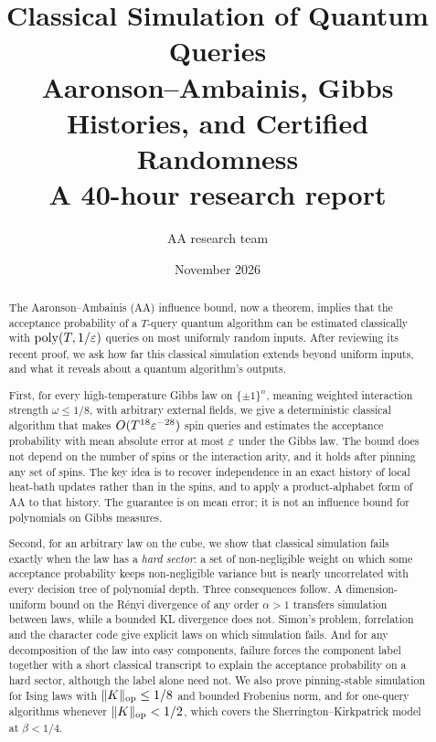\documentclass[11pt]{article}
\title{\textbf{Classical Simulation of Quantum Queries}\\[5pt]
{\Large Aaronson--Ambainis, Gibbs Histories, and Certified Randomness}\\[5pt]
{\large A 40-hour research report}}
\author{AA research team}
\date{November 2026}
\theoremstyle{definition}\newtheorem{definition}[theorem]{Definition}
\theoremstyle{remark}\newtheorem{remark}[theorem]{Remark}
\DeclareMathOperator{\poly}{poly}\DeclareMathOperator{\CAdv}{CAdv}
\begin{document}
\maketitle
\thispagestyle{fancy}
\begin{abstract}
\noindent
The Aaronson--Ambainis (AA) influence bound, now a theorem, implies that the acceptance probability of a $T$-query quantum algorithm can be estimated classically with $\poly(T,1/\eps)$ queries on most uniformly random inputs. After reviewing its recent proof, we ask how far this classical simulation extends beyond uniform inputs, and what it reveals about a quantum algorithm's outputs.

First, for every high-temperature Gibbs law on $\{\pm1\}^n$, meaning weighted interaction strength $\omega\le1/8$, with arbitrary external fields, we give a deterministic classical algorithm that makes $O(T^{18}\varepsilon^{-28})$ spin queries and estimates the acceptance probability with mean absolute error at most $\varepsilon$ under the Gibbs law. The bound does not depend on the number of spins or the interaction arity, and it holds after pinning any set of spins. The key idea is to recover independence in an exact history of local heat-bath updates rather than in the spins, and to apply a product-alphabet form of AA to that history. The guarantee is on mean error; it is not an influence bound for polynomials on Gibbs measures.

Second, for an arbitrary law on the cube, we show that classical simulation fails exactly when the law has a \emph{hard sector}: a set of non-negligible weight on which some acceptance probability keeps non-negligible variance but is nearly uncorrelated with every decision tree of polynomial depth. Three consequences follow. A dimension-uniform bound on the R\'enyi divergence of any order $\alpha>1$ transfers simulation between laws, while a bounded KL divergence does not. Simon's problem, forrelation and the character code give explicit laws on which simulation fails. And for any decomposition of the law into easy components, failure forces the component label together with a short classical transcript to explain the acceptance probability on a hard sector, although the label alone need not. We also prove pinning-stable simulation for Ising laws with $\|K\|_{\rm op}\le1/8$ and bounded Frobenius norm, and for one-query algorithms whenever $\|K\|_{\rm op}<1/2$, which covers the Sherrington--Kirkpatrick model at $\beta<1/4$.


\end{abstract}
\end{document}
